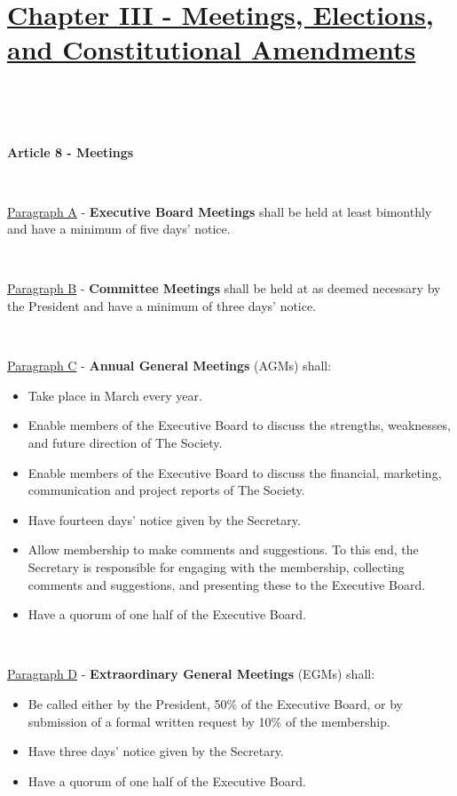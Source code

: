 \section{\underline{Chapter III - Meetings, Elections, and Constitutional Amendments}}

~

~

\large{\textbf{Article 8 - Meetings}}

~

\underline{Paragraph A} - \textbf{Executive Board Meetings} shall be
held at least bimonthly and have a minimum of five days' notice.

~

\underline{Paragraph B} - \textbf{Committee Meetings} shall be
held at as deemed necessary by the President and have a minimum of three days' notice.

~

\underline{Paragraph C} - \textbf{Annual General Meetings} (AGMs) shall:

\begin{itemize}

    \item{Take place in March every year.}

    \item{Enable members of the Executive Board to discuss the strengths, weaknesses, and future direction of The Society.}

    \item{Enable members of the Executive Board to discuss the financial, marketing, communication and project reports of The Society.}

    \item{Have fourteen days' notice given by the Secretary.}

    \item{Allow membership to make comments and suggestions. To this end, the Secretary is responsible for engaging with the membership, collecting comments and suggestions, and presenting these to the Executive Board.}

    \item{Have a quorum of one half of the Executive Board.}

\end{itemize}

~

\underline{Paragraph D} - \textbf{Extraordinary General Meetings} (EGMs)
shall:

\begin{itemize}

    \item{Be called either by the President, 50\% of the Executive Board, or by submission of a formal written request by 10\% of the membership.}

    \item{Have three days' notice given by the Secretary.}

    \item{Have a quorum of one half of the Executive Board.}

\end{itemize}

